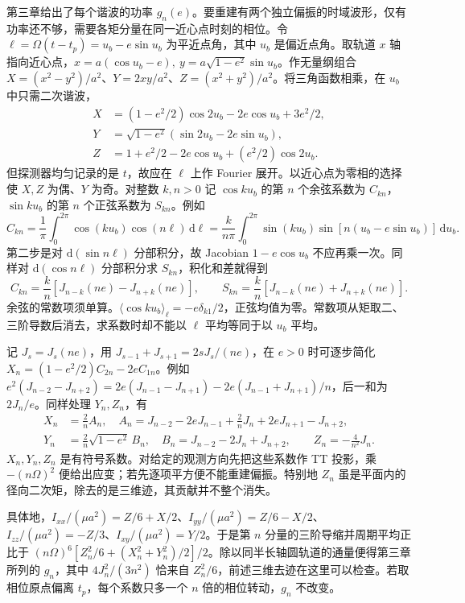 第三章给出了每个谐波的功率 $g_n(e)$。要重建有两个独立偏振的时域波形，仅有功率还不够，需要各矩分量在同一近心点时刻的相位。令 $\ell=\Omega(t-t_p)=u_b-e\sin u_b$ 为平近点角，其中 $u_b$ 是偏近点角。取轨道 $x$ 轴指向近心点，$x=a(\cos u_b-e),\ y=a\sqrt{1-e^2}\sin u_b$。作无量纲组合 $X=(x^2-y^2)/a^2$、$Y=2xy/a^2$、$Z=(x^2+y^2)/a^2$。将三角函数相乘，在 $u_b$ 中只需二次谐波，
\begin{align*}
 X&=(1-e^2/2)\cos2u_b-2e\cos u_b+3e^2/2,\\
 Y&=\sqrt{1-e^2}(\sin2u_b-2e\sin u_b),\\
 Z&=1+e^2/2-2e\cos u_b+(e^2/2)\cos2u_b .
\end{align*}
但探测器均匀记录的是 $t$，故应在 $\ell$ 上作 Fourier 展开。以近心点为零相的选择使 $X,Z$ 为偶、$Y$ 为奇。对整数 $k,n>0$ 记 $\cos ku_b$ 的第 $n$ 个余弦系数为 $C_{kn}$，$\sin ku_b$ 的第 $n$ 个正弦系数为 $S_{kn}$。例如
\[
 C_{kn}=\frac1\pi\int_0^{2\pi}\cos(ku_b)\cos(n\ell)\,\mathrm d\ell
       =\frac{k}{n\pi}\int_0^{2\pi}\sin(ku_b)
                \sin[n(u_b-e\sin u_b)]\,\mathrm du_b .
\]
第二步是对 $\mathrm d(\sin n\ell)$ 分部积分，故 Jacobian $1-e\cos u_b$ 不应再乘一次。同样对 $\mathrm d(\cos n\ell)$ 分部积分求 $S_{kn}$，积化和差就得到
\[
 C_{kn}=\frac{k}{n}[J_{n-k}(ne)-J_{n+k}(ne)],\qquad
 S_{kn}=\frac{k}{n}[J_{n-k}(ne)+J_{n+k}(ne)] .
\]
余弦的常数项须单算。$\langle\cos ku_b\rangle_\ell=-e\delta_{k1}/2$，正弦均值为零。常数项从矩取二、三阶导数后消去，求系数时却不能以 $\ell$ 平均等同于以 $u_b$ 平均。

记 $J_s=J_s(ne)$，用 $J_{s-1}+J_{s+1}=2sJ_s/(ne)$，在 $e>0$ 时可逐步简化 $X_n=(1-e^2/2)C_{2n}-2eC_{1n}$。例如
$e^2(J_{n-2}-J_{n+2})=2e(J_{n-1}-J_{n+1})-2e(J_{n-1}+J_{n+1})/n$，后一和为 $2J_n/e$。同样处理 $Y_n,Z_n$，有
\begin{align*}
 X_n&=\tfrac2n A_n,\quad
 A_n=J_{n-2}-2eJ_{n-1}+\tfrac2n J_n+2eJ_{n+1}-J_{n+2},\\
 Y_n&=\tfrac2n\sqrt{1-e^2}\, B_n,\quad B_n=J_{n-2}-2J_n+J_{n+2},\qquad
 Z_n=-\tfrac4{n^2}J_n .
\end{align*}
$X_n,Y_n,Z_n$ 是有符号系数。对给定的观测方向先把这些系数作 TT 投影，乘 $-(n\Omega)^2$ 便给出应变；若先逐项平方便不能重建偏振。特别地 $Z_n$ 虽是平面内的径向二次矩，除去的是三维迹，其贡献并不整个消失。

具体地，$I_{xx}/(\mu a^2)=Z/6+X/2$、$I_{yy}/(\mu a^2)=Z/6-X/2$、$I_{zz}/(\mu a^2)=-Z/3$、$I_{xy}/(\mu a^2)=Y/2$。于是第 $n$ 分量的三阶导缩并周期平均正比于 $(n\Omega)^6[Z_n^2/6+(X_n^2+Y_n^2)/2]/2$。除以同半长轴圆轨道的通量便得第三章所列的 $g_n$，其中 $4J_n^2/(3n^2)$ 恰来自 $Z_n^2/6$，前述三维去迹在这里可以检查。若取相位原点偏离 $t_p$，每个系数只多一个 $n$ 倍的相位转动，$g_n$ 不改变。

